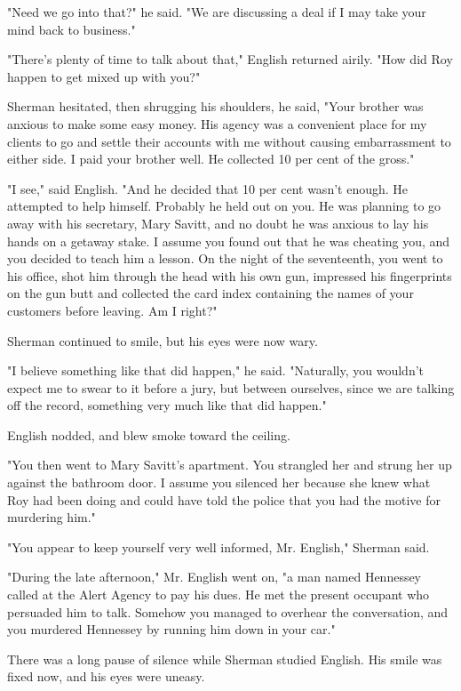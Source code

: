 \documentclass{novel}
\begin{document}
"Need we go into that?" he said. "We are discussing a deal if I may take your mind back to business."

"There's plenty of time to talk about that," English returned airily. "How did Roy happen to get mixed up with you?"

Sherman hesitated, then shrugging his shoulders, he said, "Your brother was anxious to make some easy money. His agency was a convenient place for my clients to go and settle their accounts with me without causing embarrassment to either side. I paid your brother well. He collected 10 per cent of the gross."

"I see," said English. "And he decided that 10 per cent wasn't enough. He attempted to help himself. Probably he held out on you. He was planning to go away with his secretary, Mary Savitt, and no doubt he was anxious to lay his hands on a getaway stake. I assume you found out that he was cheating you, and you decided to teach him a lesson. On the night of the seventeenth, you went to his office, shot him through the head with his own gun, impressed his fingerprints on the gun butt and collected the card index containing the names of your customers before leaving. Am I right?"

Sherman continued to smile, but his eyes were now wary.

"I believe something like that did happen," he said. "Naturally, you wouldn't expect me to swear to it before a jury, but between ourselves, since we are talking off the record, something very much like that did happen."

English nodded, and blew smoke toward the ceiling.

"You then went to Mary Savitt's apartment. You strangled her and strung her up against the bathroom door. I assume you silenced her because she knew what Roy had been doing and could have told the police that you had the motive for murdering him."

"You appear to keep yourself very well informed, Mr. English," Sherman said.

"During the late afternoon," Mr. English went on, "a man named Hennessey called at the Alert Agency to pay his dues. He met the present occupant who persuaded him to talk. Somehow you managed to overhear the conversation, and you murdered Hennessey by running him down in your car."

There was a long pause of silence while Sherman studied English. His smile was fixed now, and his eyes were uneasy.
\end{document}
